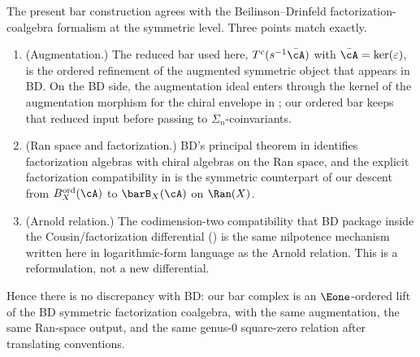 \begin{remark}
The present bar construction agrees with the Beilinson--Drinfeld
factorization-coalgebra formalism at the symmetric level. Three points
match exactly.
\begin{enumerate}[label=\textup{(\roman*)}]
\item \textup{(Augmentation.)} The reduced bar used here,
 $T^c(s^{-1}\bar\cA)$ with $\bar\cA = \ker(\varepsilon)$, is the
 ordered refinement of the augmented symmetric object that appears in
 BD. On the BD side, the augmentation ideal enters through the kernel
 of the augmentation morphism for the chiral envelope in
 \cite[Theorem~4.8.1]{BD04}; our ordered bar keeps that reduced input
 before passing to $\Sigma_n$-coinvariants.
\item \textup{(Ran space and factorization.)} BD's principal theorem in
 \cite[Theorem~3.4.9]{BD04} identifies factorization algebras with
 chiral algebras on the Ran space, and the explicit factorization
 compatibility in \cite[(3.4.11.5)]{BD04} is the symmetric counterpart
 of our descent from $B_X^{\mathrm{ord}}(\cA)$ to $\barB_X(\cA)$ on
 $\Ran(X)$.
\item \textup{(Arnold relation.)} The codimension-two compatibility that
 BD package inside the Cousin/factorization differential
 \textup{(}\cite[(3.4.11.4)--(3.4.11.5), Lemma~3.4.12]{BD04}\textup{)}
 is the same nilpotence mechanism written here in logarithmic-form
 language as the Arnold relation. This is a reformulation, not a new
 differential.
\end{enumerate}
Hence there is no discrepancy with BD: our bar complex is an
$\Eone$-ordered lift of the BD symmetric factorization coalgebra, with
the same augmentation, the same Ran-space output, and the same
genus-$0$ square-zero relation after translating conventions.
\end{remark}

